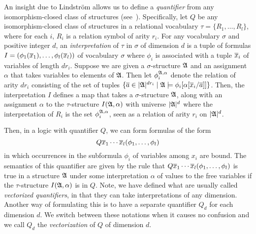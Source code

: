 \documentclass[a4paper,UKenglish,cleveref, autoref, thm-restate, anonymous]{lipics-v2021}
\begin{document}
An insight due to Lindstr\"om allows us to define a \emph{quantifier} from any isomorphism-closed class of structures (see~\cite{Ebb85}).  Specifically, let $Q$ be any isomorphism-closed class of structures in a relational vocabulary $\tau = \{ R_1,\ldots,R_l\}$, where for each $i$, $R_i$ is a relation symbol of arity $r_i$.  For any vocabulary $\sigma$ and positive integer $d$, an \emph{interpretation} of $\tau$ in $\sigma$ of dimension $d$ is a tuple of formulas $I = (\phi_1(\overline{x}_1),\dots, \phi_l(\overline{x}_l))$ of vocabulary $\sigma$ where $\phi_i$ is associated with a tuple $\overline{x}_i$ of variables of length $dr_i$.  Suppose we are given a $\sigma$-structure $\mathfrak{A}$ and an assignment $\alpha$ that takes variables to elements of $\mathfrak{A}$.  Then let $\phi_i^{\mathfrak{A},\alpha}$ denote the relation of arity $dr_i$ consisting of the set of tuples $\{\overline{a} \in |\mathfrak{A}|^{dr_i} \mid \mathfrak{A} \models \phi_i[\alpha[\overline{x}_i/\overline{a}]] \}$.  Then, the interpretation $I$ defines a map that takes a $\sigma$-structure $\mathfrak{A}$, along with an assignment $\alpha$ to the  $\tau$-structure $I(\mathfrak{A},\alpha)$ with universe $|\mathfrak{A}|^d$ where the interpretation of $R_i$ is the set $\phi_i^{\mathfrak{A},\alpha}$, seen as a relation of arity $r_i$ on $|\mathfrak{A}|^d$.

Then, in a logic with quantifier $Q$, we can form formulas of the form
$$Q \overline{x}_1\cdots \overline{x}_l (\phi_1,\ldots,\phi_l)$$
in which occurrences in the subformula $\phi_i$  of variables among $x_i$ are bound.  The semantics of this quantifier are given by the rule that 
$Q \overline{x}_1\cdots \overline{x}_l (\phi_1,\ldots,\phi_l)$ is true in a structure $\mathfrak{A}$ under some interpretation $\alpha$ of values to the free variables if the $\tau$-structure $I(\mathfrak{A},\alpha)$ is in $Q$.  Note, we have defined what are usually called \emph{vectorized quantifiers}, in that they can take interpretations of any dimension.  Another way of formulating this is to have a separate quantifier $Q_d$ for each dimension $d$.  We switch between these notations when it causes no confusion and we call $Q_d$ the \emph{vectorization} of $Q$ of dimension $d$.
\end{document}
